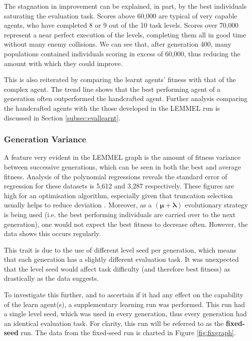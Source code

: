 The stagnation in improvement can be explained, in part, by the best individuals saturating the evaluation task. Scores above 60,000 are typical of very capable agents, who have completed 8 or 9 out of the 10 task levels. Scores over 70,000 represent a near perfect execution of the levels, completing them all in good time without many enemy collisions. We can see that, after generation 400, many populations contained individuals scoring in excess of 60,000, thus reducing the amount with which they could improve.

This is also reiterated by comparing the learnt agents' fitness with that of the complex agent. The trend line shows that the best performing agent of a generation often outperformed the handcrafted agent. Further analysis comparing the handcrafted agents with the those developed in the LEMMEL run is discussed in Section \ref{subsec:evallearnt}.


\subsubsection{Generation Variance}

A feature very evident in the LEMMEL graph is the amount of fitness variance between successive generations, which can be seen in both the best and average fitness. Analysis of the polynomial regressions reveals the standard error of regression for these datasets is 5,612 and 3,287 respectively. These figures are high for an optimisation algorithm, especially given that truncation selection usually helps to reduce deviation \cite[s.~3.8.3]{geatbx}. Moreover, as a $\pmb{(\mu  + \lambda)}$ evolutionary strategy is being used (i.e. the best performing individuals are carried over to the next generation), one would not expect the best fitness to decrease often. However, the data shows this occurs regularly.

This trait is due to the use of different level seed per generation, which means that each generation has a slightly different evaluation task. It was unexpected that the level seed would affect task difficulty (and therefore best fitness) as drastically as the data suggests.

To investigate this further, and to ascertain if it had any effect on the capability of the learn agent(s), a supplementary learning run was performed. This run had a single level seed, which was used in every generation, thus every generation had an identical evaluation task. For clarity, this run will be referred to as the \textbf{fixed-seed} run. The data from the fixed-seed run is charted in Figure \ref{fig:fixgraph}.

